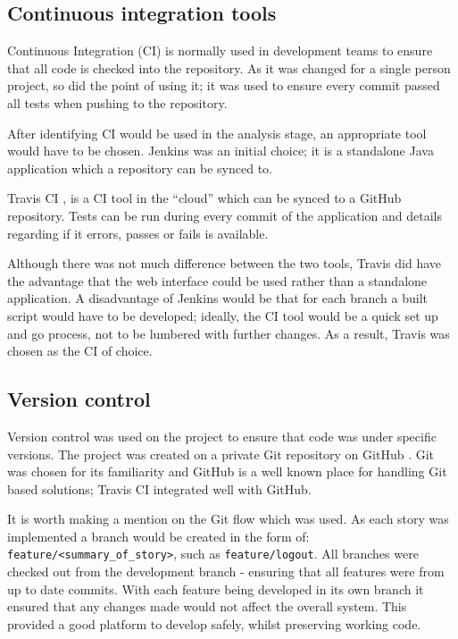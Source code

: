 \subsection{Continuous integration tools}
Continuous Integration (CI) is normally used in development teams to ensure that all code is checked into the repository. As it was changed for a single person project, so did the point of using it; it was used to ensure every commit passed all tests when pushing to the repository.

After identifying CI would be used in the analysis stage, an appropriate tool would have to be chosen. Jenkins \cite{citeulike:14023837} was an initial choice; it is a standalone Java application which a repository can be synced to.

Travis CI \cite{citeulike:14023840}, is a CI tool in the ``cloud'' which can be synced to a GitHub repository. Tests can be run during every commit of the application and details regarding if it errors, passes or fails is available.

Although there was not much difference between the two tools, Travis did have the advantage that the web interface could be used rather than a standalone application. A disadvantage of Jenkins would be that for each branch a built script would have to be developed; ideally, the CI tool would be a quick set up and go process, not to be lumbered with further changes. As a result, Travis was chosen as the CI of choice.

\subsection{Version control}
Version control was used on the project to ensure that code was under specific versions. The project was created on a private Git \cite{citeulike:14023846} repository on GitHub \cite{citeulike:13269771}. Git was chosen for its familiarity and GitHub is a well known place for handling Git based solutions; Travis CI integrated well with GitHub.

It is worth making a mention on the Git flow which was used. As each story was implemented a branch would be created in the form of: \texttt{feature/<summary\_of\_story>}, such as \texttt{feature/logout}. All branches were checked out from the development branch - ensuring that all features were from up to date commits. With each feature being developed in its own branch it ensured that any changes made would not affect the overall system. This provided a good platform to develop safely, whilst preserving working code.

